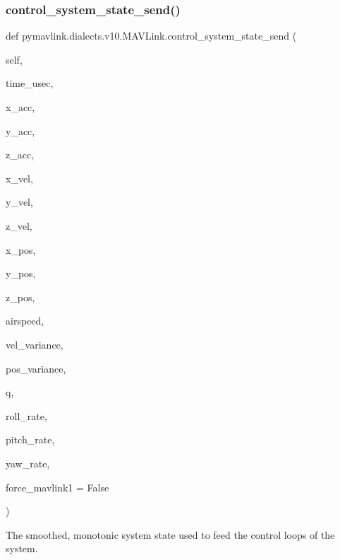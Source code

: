 \begin{DoxyVerb}
\begin{DoxyVerb}
\subsubsection{\texorpdfstring{control\+\_\+system\+\_\+state\+\_\+send()}{control\_system\_state\_send()}}
{\footnotesize\ttfamily def pymavlink.\+dialects.\+v10.\+M\+A\+V\+Link.\+control\+\_\+system\+\_\+state\+\_\+send (\begin{DoxyParamCaption}\item[{}]{self,  }\item[{}]{time\+\_\+usec,  }\item[{}]{x\+\_\+acc,  }\item[{}]{y\+\_\+acc,  }\item[{}]{z\+\_\+acc,  }\item[{}]{x\+\_\+vel,  }\item[{}]{y\+\_\+vel,  }\item[{}]{z\+\_\+vel,  }\item[{}]{x\+\_\+pos,  }\item[{}]{y\+\_\+pos,  }\item[{}]{z\+\_\+pos,  }\item[{}]{airspeed,  }\item[{}]{vel\+\_\+variance,  }\item[{}]{pos\+\_\+variance,  }\item[{}]{q,  }\item[{}]{roll\+\_\+rate,  }\item[{}]{pitch\+\_\+rate,  }\item[{}]{yaw\+\_\+rate,  }\item[{}]{force\+\_\+mavlink1 = {\ttfamily False} }\end{DoxyParamCaption})}

\begin{DoxyVerb}The smoothed, monotonic system state used to feed the control loops of
the system.


\end{DoxyVerb}
\end{DoxyVerb}
\end{DoxyVerb}
